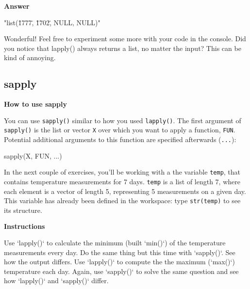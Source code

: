 \documentclass[]{article}
\newcommand{\hlstr}[1]{\textcolor[rgb]{0.251,0.627,0.251}{#1}}%
\newcommand{\hlstd}[1]{\textcolor[rgb]{0.251,0.251,0.251}{#1}}%
\newcommand{\hlkwc}[1]{\textcolor[rgb]{0.251,0.251,0.251}{#1}}%
\newcommand{\hlkwd}[1]{\textcolor[rgb]{0.878,0.439,0.125}{#1}}%
\newenvironment{Shaded}{\begin{myshaded}}{\end{myshaded}}
\renewenvironment{verbatim}{\color{codecolor}\begin{myshaded}\begin{oldverbatim}}{\end{oldverbatim}\end{myshaded}}
\newcommand{\KeywordTok}[1]{\hlkwd{#1}}
\newcommand{\DataTypeTok}[1]{\hlkwc{#1}}
\newcommand{\StringTok}[1]{\hlstr{#1}}
\newcommand{\NormalTok}[1]{\hlstd{#1}}
\begin{document}
\textbf{Answer}

\begin{verbatim}
   [1] "list(\"1777\", \"1702\", NULL, NULL)"
\end{verbatim}

Wonderful! Feel free to experiment some more with your code in the
console. Did you notice that lapply() always returns a list, no matter
the input? This can be kind of annoying.

\subsection{sapply}\label{sapply}

\textbf{How to use sapply}

You can use \texttt{sapply()} similar to how you used \texttt{lapply()}.
The first argument of \texttt{sapply()} is the list or vector \texttt{X}
over which you want to apply a function, \texttt{FUN}. Potential
additional arguments to this function are specified afterwards
(\texttt{...}):

\begin{Shaded}
\begin{Highlighting}[]
\KeywordTok{sapply}\NormalTok{(X, FUN, ...)}
\end{Highlighting}
\end{Shaded}

In the next couple of exercises, you'll be working with a the variable
\texttt{temp}, that contains temperature measurements for 7 days.
\texttt{temp} is a list of length 7, where each element is a vector of
length 5, representing 5 measurements on a given day. This variable has
already been defined in the workspace: type \texttt{str(temp)} to see
its structure.

\textbf{Instructions}

\begin{Shaded}
\begin{Highlighting}[]
\OperatorTok{*}\StringTok{ }\NormalTok{Use }\StringTok{`}\DataTypeTok{lapply()}\StringTok{`}\NormalTok{ to calculate the }\KeywordTok{minimum}\NormalTok{ (built}\OperatorTok{-}  \StringTok{`}\DataTypeTok{min()}\StringTok{`}\NormalTok{) of the temperature measurements }\NormalTok{ every day.}
\OperatorTok{*}\StringTok{ }\NormalTok{Do the same thing but this time with }\StringTok{`}\DataTypeTok{sapply()}\StringTok{`}\NormalTok{. See how the output differs.}
\OperatorTok{*}\StringTok{ }\NormalTok{Use }\StringTok{`}\DataTypeTok{lapply()}\StringTok{`}\NormalTok{ to compute the the }\KeywordTok{maximum}\NormalTok{ (}\StringTok{`}\DataTypeTok{max()}\StringTok{`}\NormalTok{) temperature }\NormalTok{ each day.}
\OperatorTok{*}\StringTok{ }\NormalTok{Again, use }\StringTok{`}\DataTypeTok{sapply()}\StringTok{`}\NormalTok{ to solve the same question and see how }\StringTok{`}\DataTypeTok{lapply()}\StringTok{`}\NormalTok{ and }\StringTok{`}\DataTypeTok{sapply()}\StringTok{`}\NormalTok{ differ.}
\end{Highlighting}
\end{Shaded}
\end{document}

